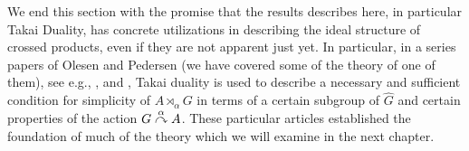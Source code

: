 We end this section with the promise that the results describes here, in particular Takai Duality, has concrete utilizations in describing the ideal structure of crossed products, even if they are not apparent just yet. In particular, in a series papers of Olesen and Pedersen (we have covered some of the theory of one of them), see e.g., \cite{olesenpedersen1}, \cite{olesenpedersen2} and \cite{olesenpedersen3}, Takai duality is used to describe a necessary and sufficient condition for simplicity of $A \rtimes_\alpha G$ in terms of a certain subgroup of $\hat G$ and certain properties of the action $G \stackrel{\alpha}{\curvearrowright} A$. These particular articles established the foundation of much of the theory which we will examine in the next chapter.
